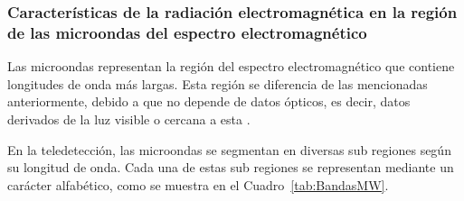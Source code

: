 \subsubsection{Características de la radiación electromagnética en la región de las microondas del espectro electromagnético}

Las microondas representan la región del espectro electromagnético que contiene longitudes de onda más largas. Esta región se diferencia de las mencionadas anteriormente, debido a que no depende de datos ópticos, es decir, datos derivados de la luz visible o cercana a esta \cite{tempfli2009principles}.

En la teledetección, las microondas se segmentan en diversas sub regiones según su longitud de onda. Cada una de estas sub regiones se representan mediante un carácter alfabético, como se muestra en el Cuadro~\ref{tab:BandasMW}.


